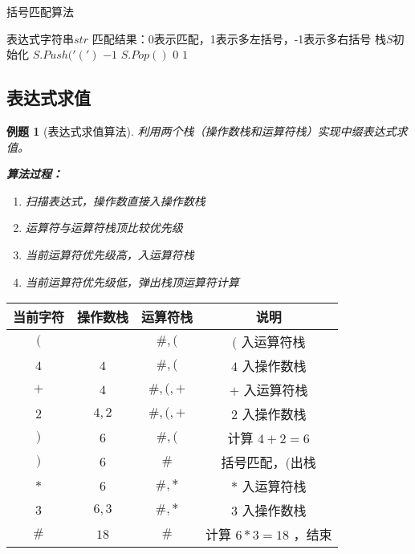 \documentclass[12pt,a4paper]{amsart}
\newtheorem{example}{例题}[section]
\begin{document}
\begin{algorithm}[H]
\caption{括号匹配算法}
\begin{algorithmic}[1]
\REQUIRE 表达式字符串$str$
\ENSURE 匹配结果：0表示匹配，1表示多左括号，-1表示多右括号
\STATE 栈$S$初始化
        \STATE $S.Push('(')$
            \RETURN $-1$ 
        \ELSE
            \STATE $S.Pop()$
        \ENDIF
    \ENDIF
\ENDFOR
{}
    \RETURN $0$ 
\ELSE
    \RETURN $1$ 
\ENDIF
\end{algorithmic}
\end{algorithm}

\subsection{表达式求值}

\begin{example}[表达式求值算法]
利用两个栈（操作数栈和运算符栈）实现中缀表达式求值。

\textbf{算法过程：}
\begin{enumerate}
\item 扫描表达式，操作数直接入操作数栈
\item 运算符与运算符栈顶比较优先级
\item 当前运算符优先级高，入运算符栈
\item 当前运算符优先级低，弹出栈顶运算符计算
\end{enumerate}
\end{example}

\begin{center}
\begin{tabular}{|c|c|c|c|}
\hline
\textbf{当前字符} & \textbf{操作数栈} & \textbf{运算符栈} & \textbf{说明} \\
\hline
$($ & & $\#,($ & $($ 入运算符栈 \\
\hline
$4$ & $4$ & $\#,($ & $4$ 入操作数栈 \\
\hline
$+$ & $4$ & $\#,(,+$ & $+$ 入运算符栈 \\
\hline
$2$ & $4,2$ & $\#,(,+$ & $2$ 入操作数栈 \\
\hline
$)$ & $6$ & $\#,($ & 计算 $4+2=6$ \\
\hline
$)$ & $6$ & $\#$ & 括号匹配，$($出栈 \\
\hline
$*$ & $6$ & $\#,*$ & $*$ 入运算符栈 \\
\hline
$3$ & $6,3$ & $\#,*$ & $3$ 入操作数栈 \\
\hline
$\#$ & $18$ & $\#$ & 计算 $6*3=18$ ，结束 \\
\hline
\end{tabular}
\end{center}
\end{document}
